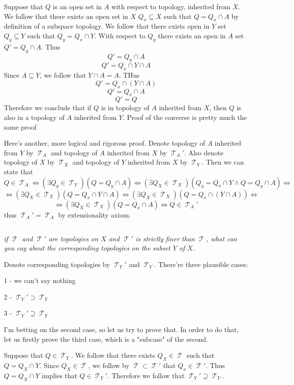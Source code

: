 \documentclass[11pt,oneside,titlepage]{book}
\DeclareMathOperator \topol {\mathcal {T}}
\DeclareMathOperator \lra {\Leftrightarrow}
\begin{document}
Suppose that $Q$ is an open set in $A$ with respect to topology, inherited from $X$.
We follow that there exists an open set in $X$  $Q_x \subseteq X$ such that $Q = Q_x \cap A$
by definition of a subspace topology. We follow that there exists open in $Y$ set $Q_y \subseteq Y$
such that $Q_y = Q_x \cap Y$. With respect to $Q_y$ there exists an open in $A$ set
$Q' = Q_y \cap A$. Thus
$$Q' = Q_y \cap A$$
$$Q' = Q_x \cap Y \cap A$$
Since $A \subseteq Y$, we follow that $Y \cap A = A$. THus
$$Q' = Q_x \cap (Y \cap A)$$
$$Q' = Q_x \cap A$$
$$Q' = Q$$
Therefore we conclude that if $Q$ is in topology of $A$ inherited from $X$, then $Q$ is also
in a topology of $A$ inherited from $Y$. Proof of the converse is pretty much the same
proof

Here's another, more logical and rigorous proof.
Denote topology of $A$ inherited from $Y$ by $\topol_A$ and topology of $A$ inherited from $X$
by $\topol_A'$. Also denote topology of $X$ by $\topol_X$ and topology of $Y$ inherited from $X$
by $\topol_Y$. Then we can state that 
$$Q \in \topol_A \lra (\exists Q_y \in \topol_Y)(Q = Q_y \cap A) \lra
(\exists Q_X \in \topol_X)(Q_y = Q_x \cap Y \land Q = Q_y \cap A) \lra$$
$$ \lra 
(\exists Q_X \in \topol_X)(Q = Q_x \cap Y  \cap A) \lra
(\exists Q_X \in \topol_X)(Q = Q_x \cap (Y  \cap A)) \lra
$$
$$ \lra 
(\exists Q_X \in \topol_X)(Q = Q_x \cap A) \lra
Q \in \topol_A'$$
thus $\topol_A' = \topol_A$ by extensionality axiom.

\subsection{}

\textit{if $\topol$ and $\topol'$ are topologies on $X$ and $\topol'$ is strictly finer
  than $\topol$, what can you cay about the corresponding topologies on the subset $Y$ of $X$.}

Denote corresponding topologies by $\topol_Y'$ and $\topol_Y$.
There're three plausible cases:

1 - we can't say nothing

2 - $\topol_Y' \supset \topol_Y$

3 - $\topol_Y' \supseteq \topol_Y$

I'm betting on the second case, so let us try to prove that. In order to do that, let us firstly
prove the third case, which is a "subcase" of the second.

Suppose that $Q \in \topol_Y$. We follow that there exists $Q_X \in \topol$ such that
$Q = Q_X \cap Y$. Since $Q_X \in \topol$, we follow by $\topol \subset \topol'$ that
$Q_x \in \topol'$. Thus $Q = Q_X \cap Y$ implies that $Q \in \topol_Y'$. Therefore we follow that
$\topol_Y' \supseteq \topol_Y$.
\end{document}

